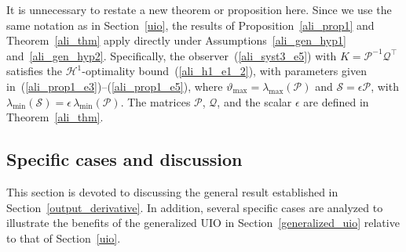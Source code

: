 \documentclass{ifacconf}
\def\eqref#1{(\ref{#1})}
\begin{document}
{%
It is unnecessary to restate a new theorem or proposition here. Since we use the same notation as in Section~\ref{uio}, the results of Proposition~\ref{ali_prop1} and Theorem~\ref{ali_thm} apply directly under Assumptions~\ref{ali_gen_hyp1} and~\ref{ali_gen_hyp2}. 
Specifically, the observer~\eqref{ali_syst3_e5} with $ K = \mathcal{P}^{-1}\mathcal{Q}^{\top} $ satisfies the $\mathcal{H}^{1}$-optimality bound~\eqref{ali_h1_e1_2}, with parameters given in~\eqref{ali_prop1_e3}--\eqref{ali_prop1_e5}, where $\vartheta_{\max} = \lambda_{\max}\!\left( \mathcal{P} \right)$ and $\mathcal{S} = \epsilon \mathcal{P}$, with $\lambda_{\min}\!\left( \mathcal{S} \right) 
= \epsilon\, \lambda_{\min}\!\left( \mathcal{P} \right)$. The matrices $\mathcal{P}$, $\mathcal{Q}$, and the scalar $\epsilon$ are defined in Theorem~\ref{ali_thm}.










\subsection{Specific cases and discussion}
\vspace*{-0.3cm}
%
This section is devoted to discussing the general result established in Section~\ref{output_derivative}. In addition, several specific cases are analyzed to illustrate the benefits of the generalized UIO in Section~\ref{generalized_uio} relative to that of Section~\ref{uio}.

}
\end{document}
